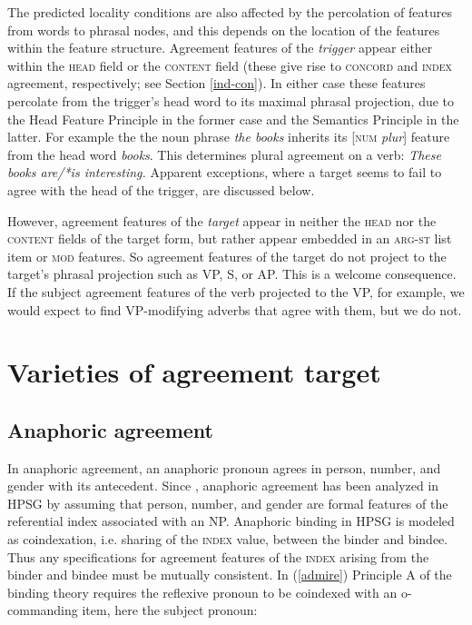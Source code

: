 \documentclass[output=paper]{langsci/langscibook}
\begin{document}
The predicted locality conditions are also affected by the percolation of features from words to phrasal nodes, and this depends on the location of the features within the feature structure.   Agreement features of the \textit{trigger} appear either within the \textsc{head} field or the \textsc{content} field (these give rise to \textsc{concord} and \textsc{index} agreement, respectively; see Section \ref{ind-con}).  In either case these features percolate from the trigger's head word to its maximal phrasal projection, due to the Head Feature Principle in the former case and the Semantics Principle in the latter.  For example the the noun phrase \textit{the books} inherits its [\textsc{num} \textit{plur}] feature from the head word \textit{books}.  This determines plural agreement on a verb:  \textit{These books are/*is interesting.}  Apparent exceptions, where a target seems to fail to agree with the head of the trigger, are discussed below.   

However, agreement features of the \textit{target} appear in neither the \textsc{head} nor the \textsc{content} fields of the target form, but rather appear embedded in an  \textsc{arg-st} list item or \textsc{mod} features.  So agreement features of the target do not project to the  target's phrasal projection such as VP, S, or AP.  This is a welcome consequence.  If the subject agreement features of the verb projected to the VP, for example, we would expect to find VP-modifying adverbs that agree with them, but we do not.  


\section{Varieties of agreement target} 

\subsection{Anaphoric agreement}
\label{ana-agr}
In anaphoric agreement, an anaphoric pronoun agrees in person, number, and gender with its antecedent.  Since \citet{Pollard+Sag:1994,Pollard+Sag:1992}, anaphoric agreement has been analyzed in HPSG by assuming that person, number, and gender are formal features of the referential index associated with an NP.  Anaphoric binding in HPSG is modeled as coindexation, i.e. sharing of the \textsc{index} value, between the binder and bindee.  Thus any specifications for agreement features of the \textsc{index} arising from the binder and bindee must be mutually consistent.  In (\ref{admire}) Principle A of the binding theory requires the reflexive pronoun to be coindexed with an o-commanding item, here the subject pronoun: 
\end{document}
